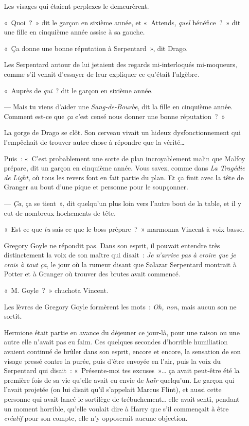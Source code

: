 Les visages qui étaient perplexes le demeurèrent.

«~Quoi~?~»
dit le garçon en sixième année, et «~Attends, \emph{quel} bénéfice~?~»
dit une fille en cinquième année assise à sa gauche.

«~Ça donne une bonne réputation à Serpentard~», dit Drago.

Les Serpentard autour de lui jetaient des regards mi-interloqués mi-moqueurs, comme s'il venait d'essayer de leur expliquer ce qu'était l'algèbre.

«~Auprès de \emph{qui}~? dit le garçon en sixième année.

--- Mais tu viens d'aider une \emph{Sang-de-Bourbe}, dit la fille en cinquième année.
Comment est-ce que \emph{ça} c'est censé nous donner une bonne réputation~?~»

La gorge de Drago se clôt.
Son cerveau vivait un hideux dysfonctionnement qui l'empêchait de trouver autre chose à répondre que la vérité…

Puis~: «~C'est probablement une sorte de plan incroyablement malin que Malfoy prépare, dit un garçon en cinquième année.
Vous savez, comme dans \emph{La Tragédie de Light}, où tous les revers font en fait partie du plan.
Et ça finit avec la tête de Granger au bout d'une pique et personne pour le soupçonner.

--- \emph{Ça}, ça se tient~», dit quelqu'un plus loin vers l'autre bout de la table, et il y eut de nombreux hochements de tête.

\later

«~Est-ce que \emph{tu} sais ce que le boss prépare~?~»
marmonna Vincent à voix basse.

Gregory Goyle ne répondit pas.
Dans son esprit, il pouvait entendre très distinctement la voix de son maître qui disait~: \emph{Je n'arrive pas à croire que je crois à tout ça}, le jour où la rumeur disant que Salazar Serpentard montrait à Potter et à Granger où trouver des brutes avait commencé.

«~M. Goyle~?~»
chuchota Vincent.

Les lèvres de Gregory Goyle formèrent les mots~: \emph{Oh, non}, mais aucun son ne sortit.

\later

Hermione était partie en avance du déjeuner ce jour-là, pour une raison ou une autre elle n'avait pas eu faim.
Ces quelques secondes d'horrible humiliation avaient continué de brûler dans son esprit, encore et encore, la sensation de son visage pressé contre la purée, puis d'être envoyée en l'air, puis la voix du Serpentard qui disait~: «~Présente-moi tes excuses~»… ça avait peut-être été la première fois de sa vie qu'elle avait eu envie de \emph{haïr} quelqu'un.
Le garçon qui l'avait projetée (on lui disait qu'il s'appelait Marcus Flint), et aussi cette personne qui avait lancé le sortilège de trébuchement… elle avait senti, pendant un moment horrible, qu'elle voulait dire à Harry que s'il commençait à être \emph{créatif} pour son compte, elle n'y opposerait aucune objection.

